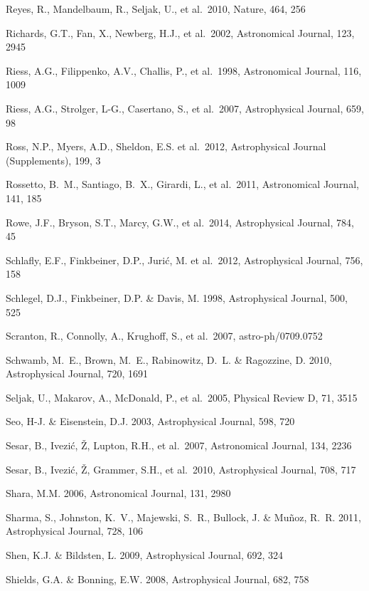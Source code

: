 \documentclass{emulateapj}
\begin{document}
\begin{thebibliography}{}
\bibitem[()]{} Reyes, R., Mandelbaum, R., Seljak, U., et al.~2010, Nature, 464, 256

\bibitem[()]{} Richards, G.T., Fan, X., Newberg, H.J., et al.~2002, Astronomical Journal, 123, 2945

\bibitem[()]{} Riess, A.G., Filippenko, A.V., Challis, P., et al.~1998, Astronomical Journal, 116, 1009

\bibitem[()]{} Riess, A.G., Strolger, L-G., Casertano, S., et al.~2007, Astrophysical Journal, 659, 98

\bibitem[()]{} Ross, N.P., Myers, A.D., Sheldon, E.S. et al.~2012,
  Astrophysical Journal (Supplements), 199, 3

\bibitem[()]{} Rossetto, B.~M., Santiago, B.~X., Girardi, L., et al.~2011, Astronomical Journal, 141, 185

\bibitem[()]{} Rowe, J.F., Bryson, S.T., Marcy, G.W., et al.~2014, Astrophysical Journal, 784, 45

\bibitem[()]{} Schlafly, E.F., Finkbeiner, D.P., Juri\'c, M. et
  al.~2012, Astrophysical Journal, 756, 158

\bibitem[()]{} Schlegel, D.J., Finkbeiner, D.P. \& Davis, M. 1998, Astrophysical Journal, 500, 525

\bibitem[()]{} Scranton, R., Connolly, A., Krughoff, S., et al.~2007, astro-ph/0709.0752

\bibitem[()]{} Schwamb, M.~E., Brown, M.~E., Rabinowitz, D.~L. \& Ragozzine, D. 2010, Astrophysical Journal, 720, 1691

\bibitem[()]{} Seljak, U., Makarov, A., McDonald, P., et al.~2005,  Physical Review D, 71, 3515

\bibitem[()]{} Seo, H-J. \& Eisenstein, D.J. 2003, Astrophysical Journal, 598, 720

\bibitem[()]{} Sesar, B., Ivezi\'{c}, \v{Z}, Lupton, R.H., et al.~2007, Astronomical Journal, 134, 2236

\bibitem[()]{} Sesar, B., Ivezi\'{c}, \v{Z}, Grammer, S.H., et al.~2010, Astrophysical Journal, 708, 717

\bibitem[()]{} Shara, M.M. 2006, Astronomical Journal, 131, 2980

\bibitem[()]{} Sharma, S., Johnston, K.~V., Majewski, S.~R., Bullock, J. \& Mu{\~n}oz, R.~R. 2011,  
                      Astrophysical Journal, 728, 106

\bibitem[()]{} Shen, K.J. \& Bildsten, L. 2009, Astrophysical Journal, 692, 324

\bibitem[()]{} Shields, G.A. \& Bonning, E.W. 2008, Astrophysical Journal, 682, 758 


\end{thebibliography}
\end{document}
